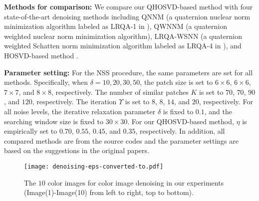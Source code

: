 \documentclass[journal]{IEEEtran}
\begin{document}
\textbf{Methods for comparison:} We compare our QHOSVD-based method with four state-of-the-art denoising methods including QNNM \cite{DBLP:journals/tip/ChenXZ20} (a quaternion nuclear norm minimization algorithm labeled as LRQA-1 in \cite{DBLP:journals/tip/ChenXZ20}), QWNNM \cite{DBLP:journals/ijon/YuZY19} (a quaternion weighted nuclear norm minimization algorithm), LRQA-WSNN \cite{DBLP:journals/tip/ChenXZ20} (a quaternion weighted Schatten norm minimization algorithm labeled as LRQA-4 in \cite{DBLP:journals/tip/ChenXZ20}), and HOSVD-based method \cite{DBLP:journals/access/GaoGZCZ19}.

\textbf{Parameter setting:} For the NSS procedure, the same parameters are set for all methods. Specifically, when $\delta=10, 20, 30, 50$, the patch size is set to $6\times 6$, $6\times 6$, $7\times7$, and  $8\times 8$, respectively. The number of similar patches $K$ is set to $70$, $70$, $90$, and $120$, respectively. The iteration $\varUpsilon$ is set to $8$, $8$, $14$, and $20$, respectively. For all noise levels, the iterative relaxation parameter $\delta$ is fixed to $0.1$, and the searching window  size is fixed to $30\times 30$. For our QHOSVD-based method, $\eta$ is empirically set to $0.70$, $0.55$, $0.45$, and $0.35$, respectively. In addition, all compared methods are from the source codes and the parameter settings are based
on the suggestions in the original papers. 

\begin{figure}[htbp]
	\centering
	\texttt{[image: denoising-eps-converted-to.pdf]}
	\caption{The $10$ color images for color image denoising in our experiments (Image(1)-Image(10) from left to right, top to bottom).}
	\label{fig2}
\end{figure}
\end{document}
